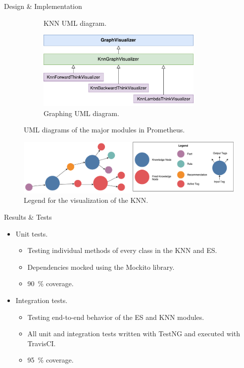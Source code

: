 \documentclass[final]{beamer} %
\begin{document}
\begin{frame}
\begin{columns}
\begin{column}{.34\textwidth}
{\begin{block}{Design \& Implementation}
\begin{figure}
\begin{subfigure}[b]{0.32\textwidth}
							\caption{KNN UML diagram.}
						\end{subfigure}
						\begin{subfigure}[b]{0.32\textwidth}
							\centering
							\includegraphics[height=1.5in]{figures/uml_graphing.pdf}
							\caption{Graphing UML diagram.}
						\end{subfigure}
							\caption{UML diagrams of the major modules in Prometheus.}
					\end{figure}
				
				
					
					\begin{figure}[!htb]
						\centering
						\includegraphics[width=\columnwidth]{figures/knn_graph_legend.pdf}
						\caption
						{Legend for the visualization of the KNN.}
					\end{figure}
					
				\end{block}
				\begin{block}{Results \& Tests}
					\begin{itemize}
						\item Unit tests.
						\begin{itemize}
							\item Testing individual methods of every class in the KNN and ES.
							\item Dependencies mocked using the Mockito library.
							\item \SI{90}{\percent} coverage.
						\end{itemize}
					\end{itemize}
					
					\begin{itemize}
						\item Integration tests.
						\begin{itemize}
							\item Testing end-to-end behavior of the ES and KNN modules.
							\item All unit and integration tests written with TestNG and executed with TravisCI.
							\item \SI{95}{\percent} coverage.
						\end{itemize}
					\end{itemize}
				

\end{block}}
\end{column}
\end{columns}
\end{frame}
\end{document}
